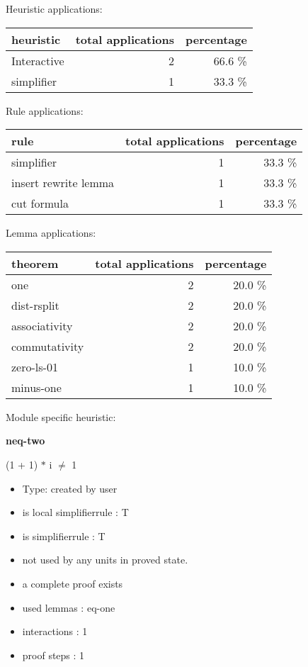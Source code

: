 \documentclass[a4paper]{article}
\begin{document}
\medskip


Heuristic applications:

\begin{supertabular}{l|r|r}
heuristic	& total applications & percentage \\ \hline
Interactive & 2 & 66.6 \% \\
simplifier & 1 & 33.3 \% \\

\end{supertabular}

Rule applications:

\begin{supertabular}{l|r|r}
rule	        & total applications & percentage \\ \hline
simplifier & 1 & 33.3 \% \\
insert rewrite lemma & 1 & 33.3 \% \\
cut formula & 1 & 33.3 \% \\

\end{supertabular}

Lemma applications:

\begin{supertabular}{l|r|r}
theorem	        & total applications & percentage \\ \hline
one & 2 & 20.0 \% \\
dist-rsplit & 2 & 20.0 \% \\
associativity & 2 & 20.0 \% \\
commutativity & 2 & 20.0 \% \\
zero-ls-01 & 1 & 10.0 \% \\
minus-one & 1 & 10.0 \% \\

\end{supertabular}

Module specific heuristic:

\pagebreak

{\LARGE\bf neq-two}\label{lemma-neq-two}

\medskip

 \Fol (1 + 1) $*$ i $\neq$ 1

\begin{itemize}

\item Type: created by user

\item is local simplifierrule : T
\item is simplifierrule : T
\item not used by any units in proved state.
\item       a complete proof exists
\item       used lemmas  : eq-one
\item       interactions : 1
\item       proof steps  : 1
\end{itemize}
\end{document}
